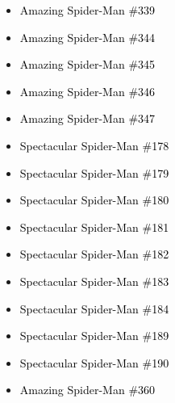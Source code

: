 \documentclass[12pt]{article}
\newcommand{\checkbox}{\raisebox{0.0ex}{\fbox{\rule{0ex}{1.5ex} \rule{1.5ex}{0ex}}}}
\begin{document}
\begin{center}
\begin{tcolorbox}[colback=white!95!gray, colframe=black, width=0.9\textwidth, arc=4mm, auto outer arc, boxrule=0.8pt]
\begin{itemize}[left=0pt,label={\checkbox}]
    \item \textcolor{black}{Amazing Spider-Man \#339}
    \item \textcolor{black}{Amazing Spider-Man \#344}
    \item \textcolor{black}{Amazing Spider-Man \#345}
    \item \textcolor{black}{Amazing Spider-Man \#346}
    \item \textcolor{black}{Amazing Spider-Man \#347}
    \item \textcolor{black}{Spectacular Spider-Man \#178}
    \item \textcolor{black}{Spectacular Spider-Man \#179}
    \item \textcolor{black}{Spectacular Spider-Man \#180}
    \item \textcolor{black}{Spectacular Spider-Man \#181}
    \item \textcolor{black}{Spectacular Spider-Man \#182}
    \item \textcolor{black}{Spectacular Spider-Man \#183}
    \item \textcolor{black}{Spectacular Spider-Man \#184}
    \item \textcolor{black}{Spectacular Spider-Man \#189}
    \item \textcolor{black}{Spectacular Spider-Man \#190}
    \item \textcolor{black}{Amazing Spider-Man \#360}
\end{itemize}
\end{tcolorbox}
\end{center}
\end{document}
